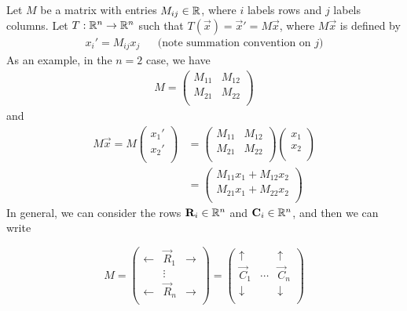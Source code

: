 \documentclass{../../template/note}
\begin{document}
    Let \(M\) be a matrix with entries \(M_{ij} \in \mathbb R\), where \(i\) labels rows and \(j\) labels columns. Let \(T: \mathbb R^n \to \mathbb R^n\) such that \(T(\vec x) = \vec x' = M\vec x\), where \(M \vec x\) is defined by
    \begin{align*}
        x_i' = M_{ij}x_j && \text{(note summation convention on } j \text{)}
    \end{align*}
    As an example, in the \(n=2\) case, we have
    \begin{align*}
        M = \begin{pmatrix}
         M_{11} & M_{12} \\
         M_{21} & M_{22} \\
        \end{pmatrix}
    \end{align*}
    and
    \begin{align*}
        M\vec x = M\begin{pmatrix}
         x_1' \\
         x_2' \\
        \end{pmatrix}
        &= \begin{pmatrix}
         M_{11} & M_{12} \\
         M_{21} & M_{22} \\
        \end{pmatrix}
        \begin{pmatrix}
         x_1 \\
         x_2 \\
        \end{pmatrix} \\
        &= \begin{pmatrix}
         M_{11}x_1 + M_{12}x_2 \\
         M_{21}x_1 + M_{22}x_2 \\
        \end{pmatrix}
    \end{align*}
    In general, we can consider the rows \(\vec R_i \in \RR^n\) and \(\vec C_i \in \RR^n\), and then we can write

    \[  
        M = \begin{pmatrix}
         \leftarrow & \vec R_1 & \rightarrow \\
          & \vdots &  \\
         \leftarrow & \vec R_n & \rightarrow \\
        \end{pmatrix}
        = \begin{pmatrix}
         \uparrow &  & \uparrow \\
         \vec C_1 & \cdots & \vec C_n \\
         \downarrow &  & \downarrow \\
        \end{pmatrix}
    \]
    
\end{document}
